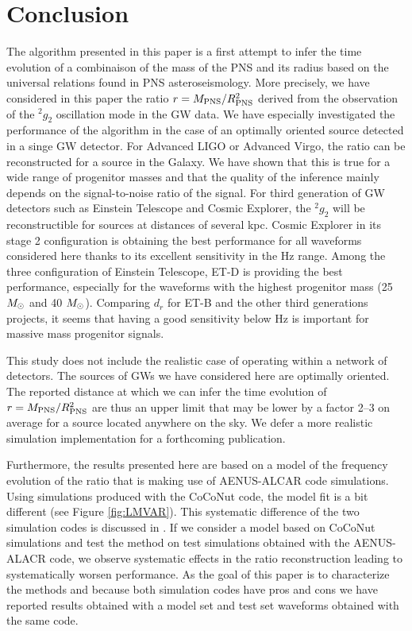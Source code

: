 \section{Conclusion}
\label{sec:conclusion}
The algorithm presented in this paper is a first attempt to infer the time evolution of a
combinaison of the mass of the PNS and its radius based on the universal relations found
in PNS asteroseismology. More precisely, we have considered in this paper the ratio
$r=M_{\rm PNS}/R_{\rm PNS}^2$ derived from the observation of the $\mbox{}^2g_2$
oscillation mode in the GW data. We have especially investigated the performance of the algorithm
in the case of an optimally oriented source detected in a singe GW detector. For Advanced LIGO
or Advanced Virgo, the ratio can be reconstructed for a source in the Galaxy. We have shown
that this is true for a wide range of progenitor masses and that the quality of the inference
mainly depends on the signal-to-noise ratio of the signal. For third generation of GW detectors such
as Einstein Telescope and Cosmic Explorer, the $\mbox{}^2g_2$ will be reconstructible for sources
at distances of several kpc. Cosmic Explorer in its stage 2 configuration is obtaining the best performance
for all waveforms considered here thanks to its excellent sensitivity in the \unit[100-1000]{Hz} range.
Among the three configuration of Einstein Telescope, ET-D is providing the best performance,
especially for the waveforms with the highest progenitor mass (25 $M_{\odot}$ and 40 $M_{\odot}$). Comparing
$d_r$ for ET-B and the other third generations projects, it seems that having a good sensitivity
below \unit[200]{Hz} is important for massive mass progenitor signals.


This study does not include the realistic case of operating within a network of detectors.
The sources of GWs we have considered here are optimally oriented. The reported distance at which
we can infer the time evolution of $r=M_{\rm PNS}/R_{\rm PNS}^2$ are thus an upper limit that may be lower
by a factor 2--3 on average for a source located anywhere on the sky. We defer a more realistic
simulation implementation for a forthcoming publication. 

Furthermore, the results presented here are based on a model of the frequency evolution of the
ratio that is making use of AENUS-ALCAR code simulations. Using simulations produced
with the CoCoNut code, the model fit is a bit different (see Figure \ref{fig:LMVAR}). This systematic
difference of the two simulation codes is discussed in \cite{Torres:2019b}. If we consider a model based
on CoCoNut simulations and test the method on test simulations obtained with the AENUS-ALACR code,
we observe systematic effects in the ratio reconstruction leading to systematically worsen performance.
As the goal of this paper is to characterize the methods and because both simulation codes have pros
and cons we have reported results obtained with a model set and test set waveforms obtained with the same
code.

